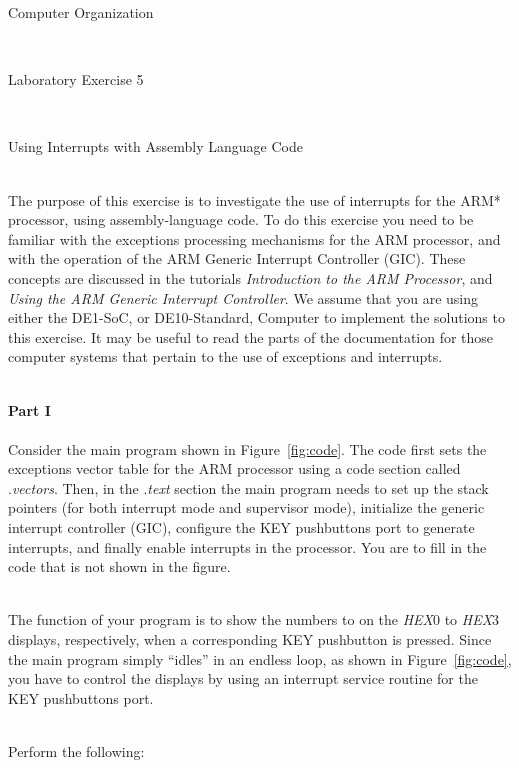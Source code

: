 \documentclass[epsfig,10pt,fullpage]{article}
\newcommand{\LabNum}{5}
\begin{document}
\centerline{\huge Computer Organization}
~\\
\centerline{\huge Laboratory Exercise \LabNum}
~\\
\centerline{\large Using Interrupts with Assembly Language Code}
~\\

\noindent
The purpose of this exercise is to investigate the use of interrupts for the ARM* 
processor, using assembly-language code. To do this exercise you need to be familiar with
the exceptions processing mechanisms for the ARM processor, and with the operation of
the ARM Generic Interrupt Controller (GIC). These concepts are discussed in the tutorials 
{\it Introduction to the ARM Processor}, and {\it Using the ARM Generic Interrupt
Controller}. We assume that you are using either the DE1-SoC, or DE10-Standard, Computer
to implement the solutions to this exercise. It may be useful to read the parts of the 
documentation for those computer systems that pertain to the use of exceptions and interrupts.

~\\
\noindent
{\bf Part I}
~\\
~\\
\noindent
Consider the main program shown in Figure~\ref{fig:code}. The code first sets the
exceptions vector table for the ARM processor using a code section called .{\it vectors}.
Then, in the .{\it text} section the main program needs to set up the stack pointers (for both 
interrupt mode and supervisor mode), initialize the generic interrupt controller (GIC), 
configure the KEY pushbuttons port to generate interrupts, and finally enable interrupts 
in the processor.  You are to fill in the code that is not shown in the figure.  

~\\
\noindent
The function of your program is to show the numbers  to  on the {\it HEX}0
to {\it HEX}3 displays, respectively, when a corresponding KEY pushbutton is pressed. 
Since the main program simply ``idles'' in an endless loop, as
shown in Figure~\ref{fig:code}, you have to control the displays by using an 
interrupt service routine for the KEY pushbuttons port.

~\\
\noindent
Perform the following:
\end{document}
